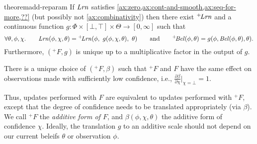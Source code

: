 \begin{linked}{theorem}{add-reparam}
	If $\mathit{Lrn} 
	$ 
	satisfies \cref{ax:zero,ax:cont-and-smooth,ax:seq-for-more,??}
	(but possibly not \cref{ax:combinativity})
	then there exist
	$^+\!\mathit{Lrn}$
	and a continuous function
	$g : \Phi \times [\bot,\!\top] \times \Theta \to [0,\infty]$
	such that
	\[
		\forall \theta,\phi,\chi.\qquad
		\mathit{Lrn}( \phi,
			\chi,
		 \theta )
		 =
		{^+}\!\mathit{Lrn}(\phi,~
		g(\phi,\chi,\theta),~
		 \theta)
		 \qquad\text{and}\qquad
		{^+}\!\mathit{Bel}(\phi,\theta) = g(\phi, \mathit{Bel}(\phi,\theta),\theta)
		.
	\]
	Furthermore,
	 $(^+\!F, g)$ is unique up to a multiplicative factor
	in the output of $g$.
	\end{linked}
\begin{coro}
There is a unique choice of $(^+\!F, \beta)$
such that $^+\!F$ and $F$ have the same effect on observations
made with sufficiently low confidence, 
i.e., $\frac{\partial \beta}{\partial \chi}\big|_{\chi=\bot} = 1$.
\end{coro}

Thus, updates performed with $F$ are equivalent
to updates performed with ${^+}\!F$, except that
the degree of confidence needs to be translated appropriately (via $\beta$).
We call $^+\!F$ the \emph{additive form of $F$},
and $\beta(\phi, \chi, \theta)$ the additive form of 
confidence $\chi$. 
Ideally,
the translation $g$ to an additive scale should not depend
on our current beleifs $\theta$ or observation $\phi$.

